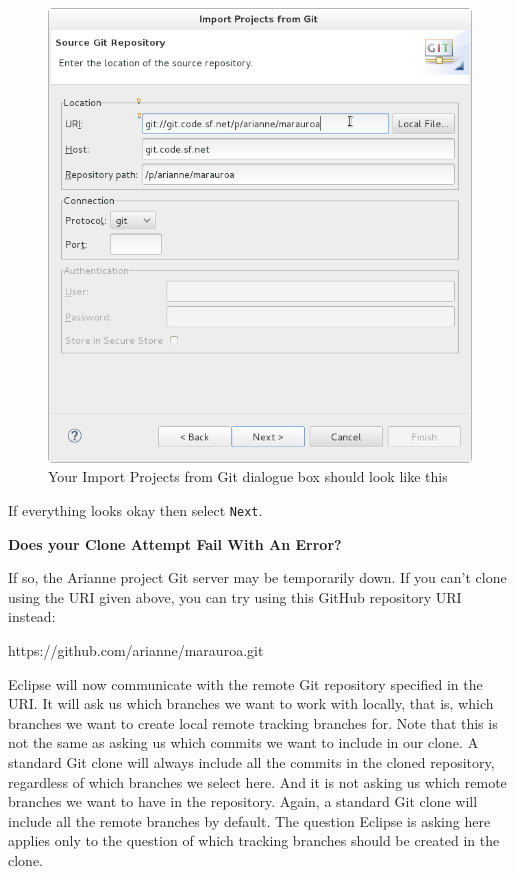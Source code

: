 \documentclass[
]{book}
\newenvironment{Shaded}{\begin{snugshade}}{\end{snugshade}}
\newcommand{\NormalTok}[1]{#1}
\begin{document}
\begin{figure}

{\centering \includegraphics[width=1\linewidth]{images/1.4enterMarauroaURI} 

}

\caption{Your Import Projects from Git dialogue box should look like this}\label{fig:enterMarauroaURI-fig}
\end{figure}

If everything looks okay then select \texttt{Next}.

\textbf{Does your Clone Attempt Fail With An Error?}

If so, the Arianne project Git server may be temporarily down. If you can't clone using the URI given above, you can try using this GitHub repository URI instead:

\begin{Shaded}
\begin{Highlighting}[]
\NormalTok{https://github.com/arianne/marauroa.git}
\end{Highlighting}
\end{Shaded}

Eclipse will now communicate with the remote Git repository specified in the URI. It will ask us which branches we want to work with locally, that is, which branches we want to create local remote tracking branches for. Note that this is not the same as asking us which commits we want to include in our clone. A standard Git clone will always include all the commits in the cloned repository, regardless of which branches we select here. And it is not asking us which remote branches we want to have in the repository. Again, a standard Git clone will include all the remote branches by default. The question Eclipse is asking here applies only to the question of which tracking branches should be created in the clone.
\end{document}

